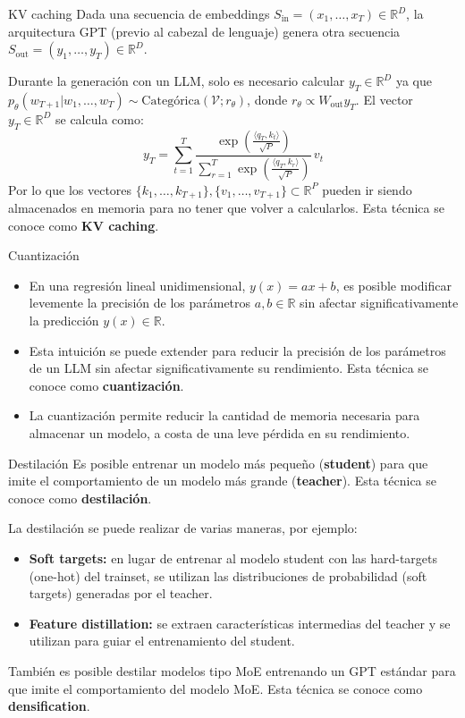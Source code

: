 \documentclass{beamer}
\newcommand{\R}{\mathbb{R}}
\begin{document}
\begin{frame}{KV caching}
    Dada una secuencia de embeddings $S_\text{in}=(x_1,\ldots,x_T)\in\R^D$, la arquitectura GPT (previo al cabezal de lenguaje) genera otra secuencia $S_\text{out}=(y_1,\ldots,y_T)\in\R^D$.

    Durante la generación con un LLM, solo es necesario calcular $y_T\in\R^D$ ya que $p_\theta(w_{T+1}|w_1,\ldots,w_T)\sim\text{Categórica}(\mathcal{V};r_\theta)$, donde $r_\theta\propto W_\text{out}y_T$. El vector $y_T\in\R^D$ se calcula como:
    \begin{equation*}
        y_T=\sum_{t=1}^T \frac{\exp\left(\frac{\langle q_T,k_t\rangle}{\sqrt{P}}\right)}{\sum_{r=1}^T \exp\left(\frac{\langle q_T,k_r\rangle}{\sqrt{P}}\right)}\,v_t
    \end{equation*}
    Por lo que los vectores $\{k_1,\ldots,k_{T+1}\},\{v_1,\ldots,v_{T+1}\}\subset\R^P$ pueden ir siendo almacenados en memoria para no tener que volver a calcularlos. Esta técnica se conoce como \textbf{KV caching}.
\end{frame}

\begin{frame}{Cuantización}
    \begin{itemize}
        \item En una regresión lineal unidimensional, $y(x)=ax+b$, es posible modificar levemente la precisión de los parámetros $a,b\in\R$ sin afectar significativamente la predicción $y(x)\in\R$.
        \item Esta intuición se puede extender para reducir la precisión de los parámetros de un LLM sin afectar significativamente su rendimiento. Esta técnica se conoce como \textbf{cuantización}.
        \item La cuantización permite reducir la cantidad de memoria necesaria para almacenar un modelo, a costa de una leve pérdida en su rendimiento.
    \end{itemize}
\end{frame}

\begin{frame}{Destilación}
    Es posible entrenar un modelo más pequeño (\textbf{student}) para que imite el comportamiento de un modelo más grande (\textbf{teacher}). Esta técnica se conoce como \textbf{destilación}.

    La destilación se puede realizar de varias maneras, por ejemplo:
    \vspace{-0.5cm}
    \begin{itemize}
        \item \textbf{Soft targets:} en lugar de entrenar al modelo student con las hard-targets (one-hot) del trainset, se utilizan las distribuciones de probabilidad (soft targets) generadas por el teacher.
        \item \textbf{Feature distillation:} se extraen características intermedias del teacher y se utilizan para guiar el entrenamiento del student.
    \end{itemize}
    También es posible destilar modelos tipo MoE entrenando un GPT estándar para que imite el comportamiento del modelo MoE. Esta técnica se conoce como \textbf{densification}.
\end{frame}
\end{document}
